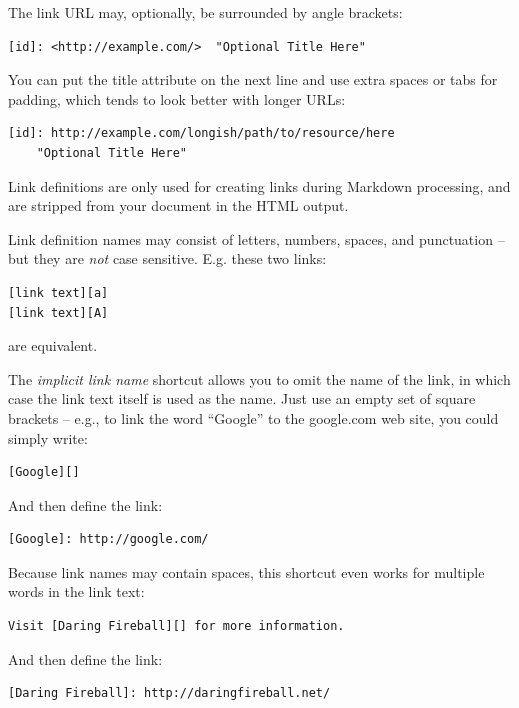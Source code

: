 The link URL may, optionally, be surrounded by angle brackets:

\begin{verbatim}
[id]: <http://example.com/>  "Optional Title Here"
\end{verbatim}

You can put the title attribute on the next line and use extra spaces
or tabs for padding, which tends to look better with longer URLs:

\begin{verbatim}
[id]: http://example.com/longish/path/to/resource/here
    "Optional Title Here"
\end{verbatim}

Link definitions are only used for creating links during Markdown
processing, and are stripped from your document in the HTML output.

Link definition names may consist of letters, numbers, spaces, and
punctuation -- but they are \emph{not} case sensitive. E.g. these two
links:

\begin{verbatim}
[link text][a]
[link text][A]
\end{verbatim}

are equivalent.

The \emph{implicit link name} shortcut allows you to omit the name of the
link, in which case the link text itself is used as the name.
Just use an empty set of square brackets -- e.g., to link the word
``Google'' to the google.com web site, you could simply write:

\begin{verbatim}
[Google][]
\end{verbatim}

And then define the link:

\begin{verbatim}
[Google]: http://google.com/
\end{verbatim}

Because link names may contain spaces, this shortcut even works for
multiple words in the link text:

\begin{verbatim}
Visit [Daring Fireball][] for more information.
\end{verbatim}

And then define the link:

\begin{verbatim}
[Daring Fireball]: http://daringfireball.net/
\end{verbatim}

